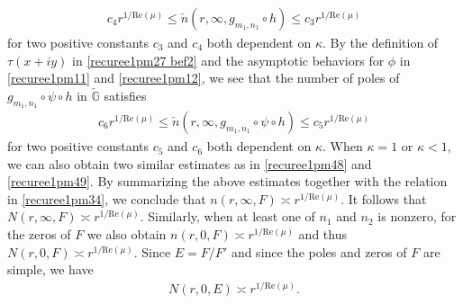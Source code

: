 \documentclass[12pt]{amsart}
\numberwithin{equation}{section}
\begin{document}
\begin{equation}\label{recuree1pm48}
\begin{split}
c_4r^{1/\text{Re}(\mu)} \leq \check{n}(r,\infty,g_{m_1,n_1}\circ h) \leq c_3 r^{1/\text{Re}(\mu)}
\end{split}
\end{equation}
for two positive constants $c_3$ and $c_4$ both dependent on $\kappa$. By the definition of $\tau(x+iy)$ in \eqref{recuree1pm27  bef2} and the asymptotic behaviors for $\phi$ in \eqref{recuree1pm11} and \eqref{recuree1pm12}, we see that the number of poles of $g_{m_1,n_1}\circ \psi \circ h$ in $\check{\mathbb{G}}$ satisfies
\begin{equation}\label{recuree1pm49}
\begin{split}
c_6r^{1/\text{Re}(\mu)} \leq \check{n}(r,\infty,g_{m_1,n_1}\circ \psi \circ h) \leq c_5r^{1/\text{Re}(\mu)}
\end{split}
\end{equation}
for two positive constants $c_5$ and $c_6$ both dependent on $\kappa$. When $\kappa=1$ or $\kappa<1$, we can also obtain two similar estimates as in \eqref{recuree1pm48} and \eqref{recuree1pm49}. By summarizing the above estimates together with the relation in \eqref{recuree1pm34}, we conclude that $n(r,\infty,F)\asymp r^{1/\text{Re}(\mu)}$. It follows that $N(r,\infty,F)\asymp r^{1/\text{Re}(\mu)}$. Similarly, when at least one of $n_1$ and $n_2$ is nonzero, for the zeros of $F$ we also obtain $n(r,0,F)\asymp r^{1/\text{Re}(\mu)}$ and thus $N(r,0,F)\asymp r^{1/\text{Re}(\mu)}$. Since $E=F/F'$ and since the poles and zeros of $F$ are simple, we have
\begin{equation}\label{recuree1pm50}
\begin{split}
N\left(r,0,E\right)\asymp r^{1/\text{Re}(\mu)}.
\end{split}
\end{equation}
\end{document}
